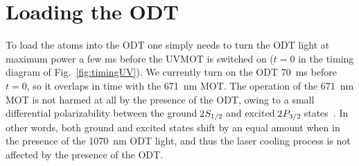 


\section{Loading the ODT}
\label{sec:odtload}

To load the atoms into the ODT one simply needs to turn the ODT light at
maximum power a few ms before the UVMOT is switched on ($t=0$ in the timing
diagram of Fig.~\ref{fig:timingUV}).  We currently turn on the ODT 70~ms before
$t=0$, so it overlaps in time with the 671~nm MOT.  The operation of the 671~nm
MOT is not harmed at all by the presence of the ODT, owing to a small
differential polarizability between the ground $\twos{1/2}$  and excited
$\twop{3/2}$ states~\cite{Safronova2012}.  In other words, both ground and
excited states shift by an equal amount when in the presence of the 1070~nm ODT
light, and thus the laser cooling process is not affected by the presence of
the ODT.   

